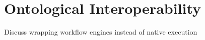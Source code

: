 \chapter{Ontological Interoperability} \label{ch:interoperability}

Discuss wrapping workflow engines instead of native execution